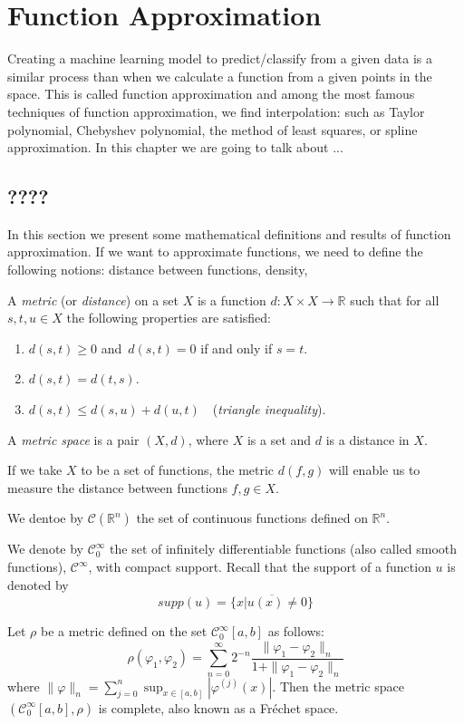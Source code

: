 \documentclass[../main.tex]{subfiles}
\begin{document}
\chapter{Function Approximation} \label{ch:methods}
\noindent Creating a machine learning model to predict/classify from a given data is a similar process than when we calculate a function from a given points in the space. This is called function approximation and among the most famous techniques of function approximation, we find interpolation: such as Taylor polynomial, Chebyshev polynomial, the method of least squares, or spline approximation. In this chapter we are going to talk about ...
\section{????}
\noindent In this section we present some mathematical definitions and results of function approximation. 
If we want to approximate functions, we need to define the following notions: distance between functions, density,


\begin{definition}\label{thm:first}
	A \emph{metric} (or \emph{distance}) on a set $X$ is a function $d:X\times X\rightarrow \mathbb{R} $ such that for all $s,t, u\in X$ the following properties are satisfied:
	\begin{enumerate}
		\item $d(s,t) \geq 0$ and $ \, d(s,t)=0$ if and only if $ s=t$.
		\item $d(s,t)=d(t,s)$.
		\item $d(s,t)\leq d(s,u)+d(u,t)\quad$(\emph{triangle inequality}).
	\end{enumerate}
A \emph{metric space} is a pair $(X,d)$, where $X$ is a set and $d$ is a distance in $X$.
\end{definition}
\noindent  If we take $X$ to be a set of functions, the metric $d(f,g)$ will enable us to measure the distance between functions $f,g \in X$.


\begin{definition} We dentoe by $\mathcal{C}(\mathbb{R}^n)$ the set of continuous functions defined on $\mathbb{R}^n$.
\end{definition}

\begin{definition} We denote by
	$ \mathcal{C}^\infty_0$ the set of infinitely differentiable functions (also called smooth functions), $\mathcal{C}^\infty$, with compact support. Recall that the support of a function $u$ is denoted by $$supp(u)= \overline{\{x | u(x)\neq 0\}}$$
\end{definition}
\begin{propo} \label{prop:frech}
Let $\rho$ be a metric defined on the set $\mathcal{C}^\infty_0[a,b]$ as follows:
$$\rho(\varphi_1,\varphi_2) = \sum_{n=0}^\infty 2^{-n}  \frac{\|\varphi_1 -\varphi_2\|_n}{1+\|\varphi_1 -\varphi_2\|_n}$$ where $\|\varphi\|_n= \sum_{j=0}^n \sup_{x\in [a,b]} | \varphi^{(j)}(x)| $.  Then the metric space $(\mathcal{C}^\infty_0[a,b],\rho)$  is complete, also known as a Fréchet space.
\end{propo}
\end{document}
